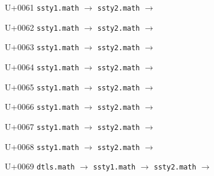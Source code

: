 \documentclass{article}
\begin{document}
\begin{substitutions}
\goodbreak

U+0061  \linebreak
    \texttt{ssty1.math} $\to$  \linebreak
    \texttt{ssty2.math} $\to$  

\goodbreak

U+0062  \linebreak
    \texttt{ssty1.math} $\to$  \linebreak
    \texttt{ssty2.math} $\to$  

\goodbreak

U+0063  \linebreak
    \texttt{ssty1.math} $\to$  \linebreak
    \texttt{ssty2.math} $\to$  

\goodbreak

U+0064  \linebreak
    \texttt{ssty1.math} $\to$  \linebreak
    \texttt{ssty2.math} $\to$  

\goodbreak

U+0065  \linebreak
    \texttt{ssty1.math} $\to$  \linebreak
    \texttt{ssty2.math} $\to$  

\goodbreak

U+0066  \linebreak
    \texttt{ssty1.math} $\to$  \linebreak
    \texttt{ssty2.math} $\to$  

\goodbreak

U+0067  \linebreak
    \texttt{ssty1.math} $\to$  \linebreak
    \texttt{ssty2.math} $\to$  

\goodbreak

U+0068  \linebreak
    \texttt{ssty1.math} $\to$  \linebreak
    \texttt{ssty2.math} $\to$  

\goodbreak

U+0069  \linebreak
    \texttt{dtls.math} $\to$  \linebreak
    \texttt{ssty1.math} $\to$  \linebreak
    \texttt{ssty2.math} $\to$  


\end{substitutions}
\end{document}
